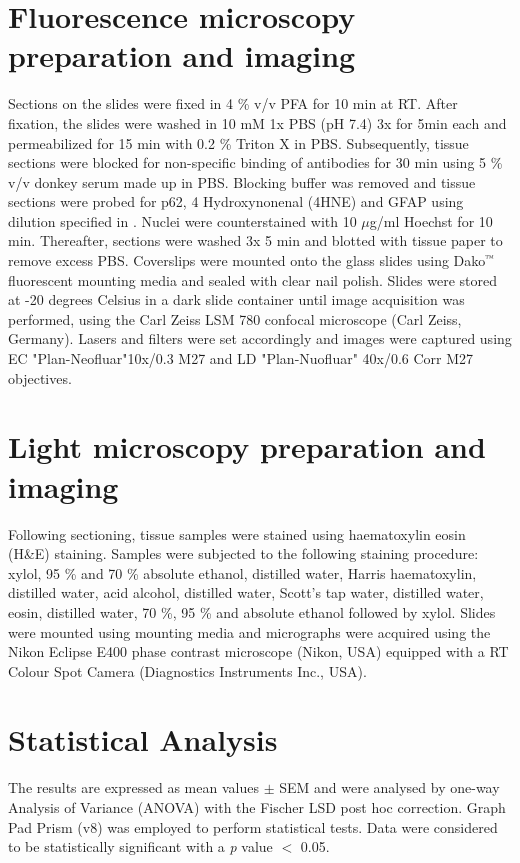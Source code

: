 \section{Fluorescence microscopy preparation and imaging}
Sections on the slides were fixed in 4 \% v/v PFA for 10 min at RT. After fixation, the slides were washed in 10 mM 1x PBS (pH 7.4) 3x for 5min each and permeabilized for 15 min with 0.2 \% Triton X in PBS. Subsequently, tissue sections were blocked for non-specific binding of antibodies for 30 min using 5 \% v/v donkey serum made up in PBS. Blocking buffer was removed and tissue sections were probed for p62, 4 Hydroxynonenal (4HNE) and GFAP using dilution specified in . Nuclei were counterstained with 10 $\mu$g/ml Hoechst for 10 min. Thereafter, sections were washed 3x 5 min and blotted with tissue paper to remove excess PBS. Coverslips were mounted onto the glass slides using Dako${\textsuperscript{\tiny{\texttrademark}}}$ fluorescent mounting media and sealed with clear nail polish. Slides were stored at -20 degrees Celsius in a dark slide container until image acquisition was performed, using the Carl Zeiss LSM 780 confocal microscope (Carl Zeiss, Germany). Lasers and filters were set accordingly and images were captured using EC "Plan-Neofluar"10x/0.3 M27 and LD "Plan-Nuofluar" 40x/0.6 Corr M27 objectives.

\section{Light microscopy preparation and imaging}
Following sectioning, tissue samples were stained using haematoxylin eosin (H\&E) staining. Samples were subjected to the following staining procedure: xylol, 95 \% and 70 \% absolute ethanol, distilled water, Harris haematoxylin, distilled water, acid alcohol, distilled water, Scott's tap water, distilled water, eosin, distilled water, 70 \%, 95 \% and absolute ethanol followed by xylol. Slides were mounted using mounting media and micrographs were acquired using the Nikon Eclipse E400 phase contrast microscope (Nikon, USA) equipped with a RT Colour Spot Camera (Diagnostics Instruments Inc., USA). 

\section{Statistical Analysis}
The results are expressed as mean values $\pm$ SEM and were analysed by one-way Analysis of Variance (ANOVA) with the Fischer LSD post hoc correction. Graph Pad Prism (v8) was employed to perform statistical tests. Data were considered to be statistically significant with a \textit{p} value $<$ 0.05.
